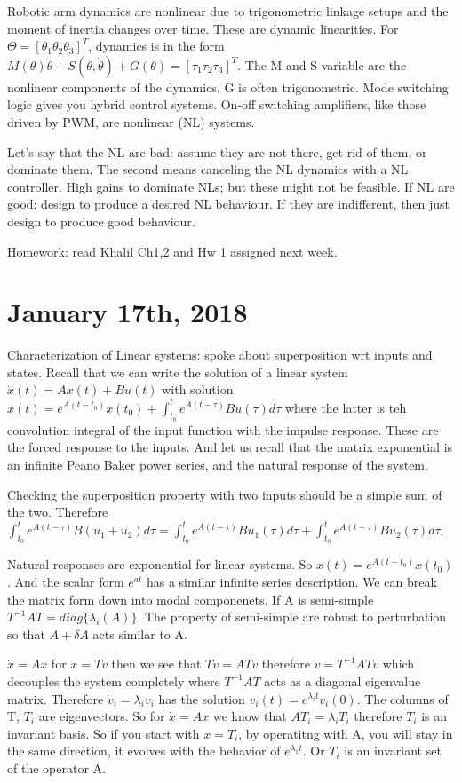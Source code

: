 \documentclass[11pt]{article}
\begin{document}
Robotic arm dynamics are nonlinear due to trigonometric linkage setups and the moment of inertia changes over time. These are dynamic linearities. For $\Theta = [ \theta_1 \theta_2 \theta_3 ]^T$, dynamics is in the form $M(\theta)\ddot{\theta} + S(\theta,\dot{\theta}) + G(\theta) = [\tau_1 \tau_2 \tau_3]^T$. The M and S variable are the nonlinear components of the dynamics. G is often trigonometric. Mode switching logic gives you hybrid control systems. On-off switching amplifiers, like those driven by PWM, are nonlinear (NL) systems.

Let's say that the NL are bad: assume they are not there, get rid of them, or dominate them. The second means canceling the NL dynamics with a NL controller. High gains to dominate NLs; but these might not be feasible. If NL are good: design to produce a desired NL behaviour. If they are indifferent, then just design to produce good behaviour. 

Homework: read Khalil Ch1,2 and Hw 1 assigned next week.



\section*{January 17th, 2018}
Characterization of Linear systems: spoke about superposition wrt inputs and states. Recall that we can write the solution of a linear system $\dot{x}(t)= Ax(t) + Bu(t)$ with solution $x(t) = e^{A(t-t_0)}x(t_0) + \int_{t_0}^t e^{A(t-\tau)}Bu(\tau)d\tau$ where the latter is teh convolution integral of the input function with the impulse response. These are the forced response to the inputs. And let us recall that the matrix exponential is an infinite Peano Baker power series, and the natural response of the system.

Checking the superposition property with two inputs should be a simple sum of the two. Therefore $\int_{t_0}^t e^{A(t-\tau)}B(u_1 + u_2)d\tau = \int_{t_0}^t e^{A(t-\tau)}Bu_1(\tau)d\tau + \int_{t_0}^t e^{A(t-\tau)}Bu_2(\tau)d\tau$. 

Natural responses are exponential for linear systems. So $x(t) = e^{A(t-t_0)}x(t_0)$. And the scalar form $e^{at}$ has a similar infinite series description. We can break the matrix form down into modal componenets. If A is semi-simple $T^{-1}AT=diag\{\lambda_i(A)\}$. The property of semi-simple are robust to perturbation so that $A+\delta A$ acts similar to A. 

$\dot{x} = Ax$ for $x = Tv$ then we see that $T\dot{v} = ATv$ therefore $\dot{v} = T^{-1}ATv$ which decouples the system completely where $T^{-1}AT$ acts as a diagonal eigenvalue matrix. Therefore $\dot{v}_i = \lambda_iv_i$ has the solution $v_i(t) = e^{\lambda_i t}v_i(0)$. The columns of T, $T_i$ are eigenvectors. So for $\dot{x}=Ax$ we know that $AT_i = \lambda_iT_i$ therefore $T_i$ is an invariant basis. So if you start with $x=T_i$, by operatitng with A, you will stay in the same direction, it evolves with the behavior of $e^{\lambda_1t}$. Or $T_i$ is an invariant set of the operator A. 
\end{document}
